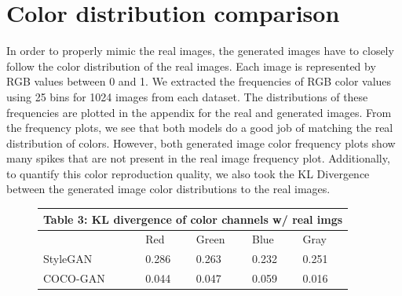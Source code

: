 \documentclass{article}
\begin{document}
        \section{Color distribution comparison}
        \label{subsec:colorDistribution}
        In order to properly mimic the real images, the generated images have to closely follow the color distribution of the real images. Each image is represented by RGB values between 0 and 1. We extracted the frequencies of RGB color values using 25 bins for 1024 images from each dataset. The distributions of these frequencies are plotted in the appendix for the real and generated images. 
        From the frequency plots, we see that both models do a good job of matching the real distribution of colors.
        However, both generated image color frequency plots show many spikes that are not present in the real image frequency plot. Additionally, to quantify this color reproduction quality, we also took the KL Divergence between the generated image color distributions to the real images.
        
        \begin{figure}[H]
            \centering
            \begin{tabular}{ |p{2cm}|p{1cm}|p{1cm}|p{1cm}|p{1cm}|  }
                 \hline
                 \multicolumn{5}{|c|}{Table 3: KL divergence of color channels w/ real imgs} \\
                 \hline
                & Red & Green & Blue & Gray  \\
                \hline
                StyleGAN & 0.286    & 0.263      & 0.232     &  0.251 \\
                \hline
                COCO-GAN  & 0.044    & 0.047      & 0.059     &  0.016\\
                \hline
            \end{tabular}
        \end{figure}
        
\end{document}

